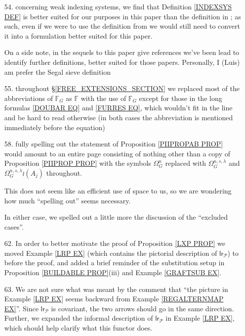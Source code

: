 \documentclass{article}
\begin{document}
\begin{itemize}
	\item[54.] concerning weak indexing systems,
	we find that Definition \ref{INDEXSYS DEF}
	is better suited for our purposes in this paper than 
	the definition in \cite{Pe17}; as such, even if we were to use the definition from \cite{Pe17} we would still need to convert it into a formulation better suited for this paper.
	
	On a side note, in the sequels to this paper 
	{\color{red} give references}
	we've been lead to identify further definitions,
	better suited for those papers.
	Personally, I (Luis) am prefer the Segal sieve definition
	
	
	\item[55.] throughout \S \ref{FREE_EXTENSIONS_SECTION}
	we replaced most of the abbreviations of
	$\mathbb{F}_G$ as $\mathbb{F}$ with the use of $\mathbb{F}_G$
	except for those in the long formulas
	\eqref{DOUBAR EQ} and \eqref{FURRES EQ},
	which wouldn't fit in the line and be hard to read otherwise
	(in both cases the abbreviation is mentioned immediately before the equation)

	\item[58.]
	fully spelling out the statement of
	Proposition \ref{PIIPROPAB PROP}
	would amount to an entire page
	consisting of nothing other than a copy of 
	Proposition \ref{PIIPROP PROP}
	with the symbols 
	$\Omega^n_G$
	replaced with 
	$\Omega^{n,s,\lambda}_{G}$ and
	$\Omega^{n,s,\lambda}_{G} \wr (A_j)$
	throughout.
	
	This does not seem like an efficient use of space to us, 
	so we are wondering how much ``spelling out'' seems necessary.
	
	In either case, we spelled out a little more the discussion of the ``excluded cases''.

	\item[62.] 
	In order to better motivate the proof of 
	Proposition \ref{LXP PROP}
	we moved Example \ref{LRP EX}
	(which contains the pictorial description of $\mathsf{lr}_{\mathcal{P}}$) to before the proof,
	and added a brief reminder of the substitution setup in 
	Proposition \ref{BUILDABLE PROP}(iii)
	and Example \ref{GRAFTSUB EX}.

	\item[63.]
	We are not sure what was meant by the comment that
	``the picture in Example \ref{LRP EX} seems backward from
	Example \ref{REGALTERNMAP EX}''.
	Since $\mathsf{lr}_{\mathcal{P}}$
	is covariant, the two arrows should go in the same direction.
	Further, we expanded the informal description
	of $\mathsf{lr}_{\mathcal{P}}$
	in Example \ref{LRP EX},
	which should help clarify what this functor does.
	

\end{itemize}
\end{document}
